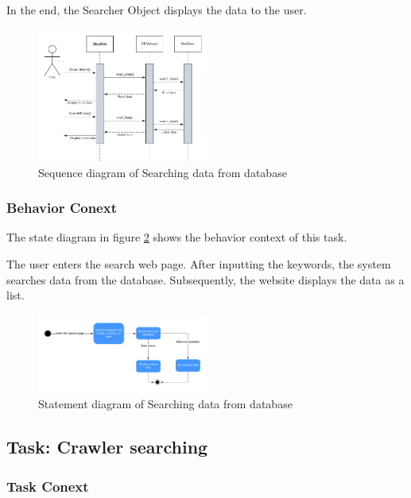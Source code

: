 \documentclass[conference]{IEEEtran}
\begin{document}
In the end, the Searcher Object displays the data to the user.
\begin{figure}[htbp]
	\centerline{\includegraphics[width=0.5\textwidth]{image/searching hotel sequence1.pdf}}
	\caption{Sequence diagram of Searching data from database }
	\label{sequence1}
\end{figure}

\subsubsection{\textbf{Behavior Conext }}

\textbf{}

The state diagram in figure \ref{statement1} shows the behavior context of this task. 

The user enters the search web page.  After inputting the keywords, the system searches data from the database. Subsequently, the website displays the data as a list. 

\begin{figure}[htbp]
	\centerline{\includegraphics[width=0.5\textwidth]{image/searching hotel statement1.pdf}}
	\caption{Statement diagram of Searching data from database }
	\label{statement1}
\end{figure}

\subsection{\textbf{Task: Crawler searching }}



\subsubsection{\textbf{Task Conext }}
\textbf{}
\end{document}
